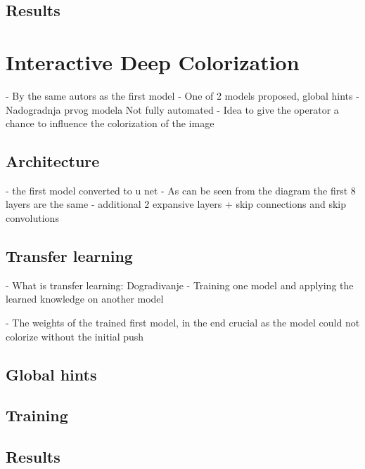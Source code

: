 \subsection{Results}

\section{Interactive Deep Colorization}
\label{sec:ideep}

- By the same autors as the first model
- One of 2 models proposed, global hints
- Nadogradnja prvog modela
Not fully automated
- Idea to give the operator a chance to influence the colorization of the image

\subsection{Architecture}
- the first model converted to u net
- As can be seen from the diagram the first 8 layers are the same
- additional 2 expansive layers + skip connections and skip convolutions

\subsection{Transfer learning}

- What is transfer learning:
	Dogradivanje
	- Training one model and applying the learned knowledge on another model
	
- The weights of the trained first model, in the end crucial as the model could not colorize without the initial push

\subsection{Global hints}


\subsection{Training}

\subsection{Results}